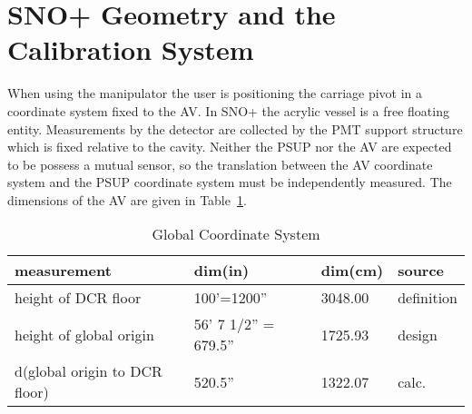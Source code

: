 

\section{SNO+ Geometry and the Calibration System}

When using the manipulator the user is positioning the carriage pivot
in a coordinate system fixed to the AV. In SNO+ the acrylic vessel is
a free floating entity. Measurements by the detector are collected by
the PMT support structure which is fixed relative to the
cavity. Neither the PSUP nor the AV are expected to be possess a
mutual sensor, so the translation between the AV coordinate system and
the PSUP coordinate system must be independently measured. The
dimensions of the AV are given in Table~\ref{tab:avdims}.

\begin{table}
  \begin{center}
    \begin{tabular}{llll}
      \hline
      measurement & dim(in) & dim(cm) & source \\
      \hline
      height of DCR floor & 100'=1200'' & 3048.00 & definition \\
      height of global origin & 56' 7 1/2'' = 679.5'' & 1725.93 &
      design \\
      d(global origin to DCR floor) & 520.5'' & 1322.07 & calc. \\
      \hline
    \end{tabular}
  \end{center}
  \caption{Global Coordinate System}
  \label{tab:avdims}
\end{table}

